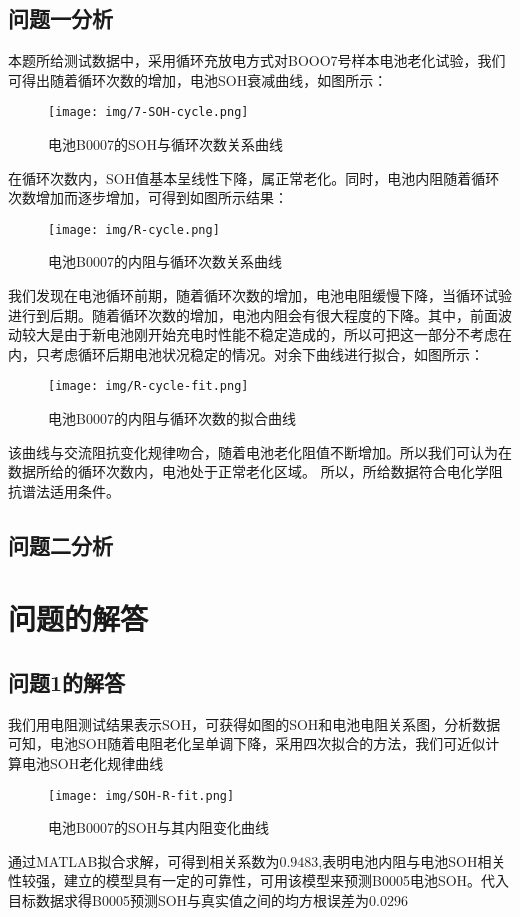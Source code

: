\documentclass{cumcm}
\begin{document}
\subsection{问题一分析}
本题所给测试数据中，采用循环充放电方式对BOOO7号样本电池老化试验，我们可得出随着循环次数的增加，电池SOH衰减曲线，如图所示：
\begin{figure}[H]
\centering
\texttt{[image: img/7-SOH-cycle.png]}
\caption{电池B0007的SOH与循环次数关系曲线}\label{figure-a}
\end{figure}

\newpage
在循环次数内，SOH值基本呈线性下降，属正常老化。同时，电池内阻随着循环次数增加而逐步增加，可得到如图所示结果：
\begin{figure}[H]
\centering
\texttt{[image: img/R-cycle.png]}
\caption{电池B0007的内阻与循环次数关系曲线}\label{figure-b}
\end{figure}

我们发现在电池循环前期，随着循环次数的增加，电池电阻缓慢下降，当循环试验进行到后期。随着循环次数的增加，电池内阻会有很大程度的下降。其中，前面波动较大是由于新电池刚开始充电时性能不稳定造成的，所以可把这一部分不考虑在内，只考虑循环后期电池状况稳定的情况。对余下曲线进行拟合，如图所示：\par
\begin{figure}[H]
\centering
\texttt{[image: img/R-cycle-fit.png]}
\caption{电池B0007的内阻与循环次数的拟合曲线}
\end{figure}
该曲线与交流阻抗变化规律吻合，随着电池老化阻值不断增加。所以我们可认为在数据所给的循环次数内，电池处于正常老化区域。
所以，所给数据符合电化学阻抗谱法适用条件。


\subsection{问题二分析}



\section{问题的解答}
\subsection{问题1的解答}

我们用电阻测试结果表示SOH，可获得如图的SOH和电池电阻关系图，分析数据可知，电池SOH随着电阻老化呈单调下降，采用四次拟合的方法，我们可近似计算电池SOH老化规律曲线
\begin{figure}[H]
\centering
\texttt{[image: img/SOH-R-fit.png]}
\caption{电池B0007的SOH与其内阻变化曲线}
\end{figure}
通过MATLAB拟合求解，可得到相关系数为$0.9483$,表明电池内阻与电池SOH相关性较强，建立的模型具有一定的可靠性，可用该模型来预测B0005电池SOH。代入目标数据求得B0005预测SOH与真实值之间的均方根误差为$0.0296$
\end{document}
